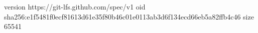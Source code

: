 version https://git-lfs.github.com/spec/v1
oid sha256:e1f5481f0ecf81613d61e35f80b46c01e0113ab3d6f134ecd66eb5a82ffb4c46
size 65541
